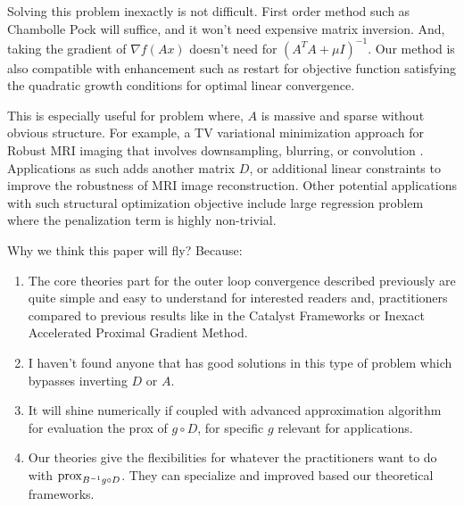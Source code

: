 \documentclass[12pt]{article}
\begin{document}
    Solving this problem inexactly is not difficult. 
    First order method such as Chambolle Pock will suffice, and it won't need expensive matrix inversion. 
    And, taking the gradient of $\nabla f(Ax)$ doesn't need for $(A^TA + \mu I)^{-1}$. 
    Our method is also compatible with enhancement such as restart for objective function satisfying the quadratic growth conditions for optimal linear convergence. 
    \par
    This is especially useful for problem where, $A$ is massive and sparse without obvious structure. 
    For example, a TV variational minimization approach for Robust MRI imaging that involves downsampling, blurring, or convolution \cite{zhang_robust_2022, joshi_mri_2009}\cite[Section 7.4]{chambolle_introduction_2016}. 
    Applications as such adds another matrix $D$, or additional linear constraints to improve the robustness of MRI image reconstruction. 
    Other potential applications with such structural optimization objective include large regression problem where the penalization term is highly non-trivial. 
    \par
    Why we think this paper will fly? 
    Because: 
    \begin{enumerate}
        \item The core theories part for the outer loop convergence described previously are quite simple and easy to understand for interested readers and, practitioners compared to previous results like in the Catalyst Frameworks or Inexact Accelerated Proximal Gradient Method. 
        \item I haven't found anyone that has good solutions in this type of problem which bypasses inverting $D$ or $A$. 
        \item It will shine numerically if coupled with advanced approximation algorithm for evaluation the prox of $g\circ D$, for specific $g$ relevant for applications. 
        \item Our theories give the flexibilities for whatever the practitioners want to do with $\operatorname{prox}_{B^{-1}g\circ D}$. They can specialize and improved based our theoretical frameworks. 
    \end{enumerate}
    



\end{document}
